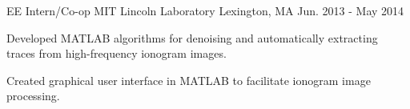 \begin{cventries}
  \cventry
    {EE Intern/Co-op} %
    {MIT Lincoln Laboratory} %
    {Lexington, MA} %
    {Jun. 2013 - May 2014} %
    {
      \begin{cvitems} %
        \item {Developed MATLAB algorithms for denoising and automatically extracting traces from high-frequency ionogram images.}
        \item {Created graphical user interface in MATLAB to facilitate ionogram image processing.}
      \end{cvitems} 
    }
\end{cventries}
